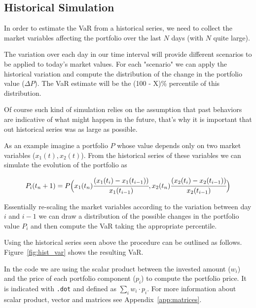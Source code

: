 \subsection{Historical Simulation}\label{historical-simulation}

In order to estimate the VaR from a historical series, we need to
collect the market variables affecting the portfolio over the last \(N\) days (with \(N\) quite large).

The variation over each day in our time interval will provide different
scenarios to be applied to today's market values.
For each "scenario" we can apply the historical variation and compute the distribution of the change in the portfolio value
(\(\Delta P\)). The VaR estimate will be the (100 - X)\% percentile of this distribution. 

Of course such kind of simulation relies on the assumption that past
behaviors are indicative of what might happen in the future, that's why it is important that out historical series was as large as possible.

As an example imagine a portfolio \(P\) whose value depends only on two market variables (\(x_1(t) , x_2(t)\)). From the historical series of these variables we can simulate the evolution of the portfolio as

\begin{equation}P_i(t_n+1) = P\Big(x_1(t_n)\cfrac{(x_1(t_i)-x_1(t_{i-1}))}{x_1(t_{i-1})}, x_2(t_n)\cfrac{(x_2(t_i)-x_2(t_{i-1}))}{x_2(t_{i-1})}\Big)\end{equation}

Essentially re-scaling the market variables according to the variation
between day \(i\) and \(i-1\) we can draw a distribution of the possible
changes in the portfolio value \(P_i\) and then compute the VaR taking
the appropriate percentile.

Using the historical series seen above the procedure can be outlined as follows. Figure~\ref{fig:hist_var} shows the resulting VaR. 

In the code we are using the scalar product between the invested amount ($w_i$) and the price of each portfolio component ($p_i$) to compute the portfolio price. It is indicated with \texttt{.dot} and defined as $\sum_{i} w_i \cdot p_i$.
For more information about scalar product, vector and matrices see Appendix~\ref{app:matrices}. 

